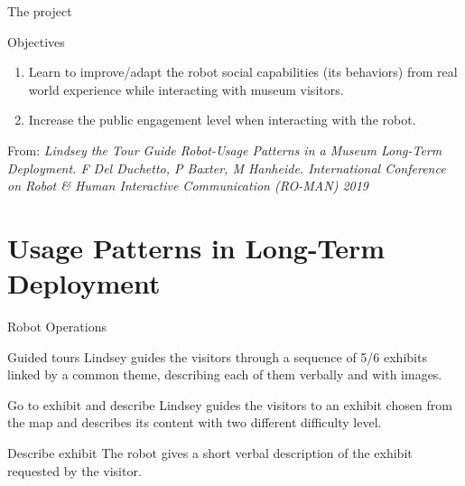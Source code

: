\documentclass[english,svgnames,notes=hide,14pt]{beamer}
\begin{document}
\begin{frame}{The project}
    \begin{block}{Objectives} %
        \begin{enumerate}
            \item Learn to improve/adapt the robot social capabilities (its behaviors) from real world experience while interacting with museum visitors. 
            \item Increase the public engagement level when interacting with the robot.
        \end{enumerate}
    \end{block}
    
    \begin{block}{} %
        {\tiny From: \emph{Lindsey the Tour Guide Robot-Usage Patterns in a Museum Long-Term Deployment. F Del Duchetto, P Baxter, M Hanheide. International Conference on Robot \& Human Interactive Communication (RO-MAN) 2019}}
    \end{block}
    
\end{frame}

\section{Usage Patterns in Long-Term Deployment}
\begin{frame}[shrink=5]{Robot Operations}
    \begin{block}{Guided tours}
        Lindsey guides the visitors through a sequence of 5/6 exhibits linked by a common theme, describing each of them verbally and with images.
    \end{block}
    \begin{block}{Go to exhibit and describe}
        Lindsey guides the visitors to an exhibit chosen from the map and describes its content with two different difficulty level.
    \end{block}
    \begin{block}{Describe exhibit}
        The robot gives a short verbal description of the exhibit requested by the visitor.
    \end{block}
\end{frame}
\end{document}
